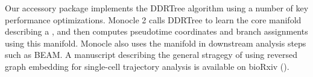 \documentclass[10pt,oneside]{article}\usepackage[]{graphicx}\usepackage[]{color}
\begin{document}
Our accessory package  implements the DDRTree algorithm using
a number of key performance optimizations. Monocle 2 calls DDRTree to learn the
core manifold describing a , and then computes pseudotime
coordinates and branch assignments using this manifold. Monocle also uses the 
manifold in downstream analysis steps such as BEAM. A manuscript describing the
general stragegy of using reversed graph embedding for single-cell trajectory
analysis is available on bioRxiv (\cite{Qiu2017-nx}).

% 
% 	
% 	
\end{document}
